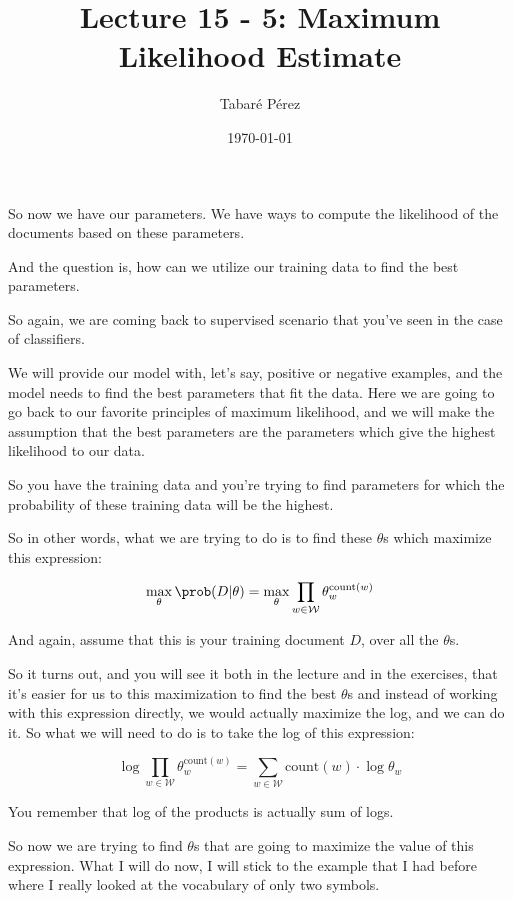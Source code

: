 \documentclass[a4paper, 12pt]{article}
\author{Tabaré Pérez}
\date{\today}
\title{Lecture 15 - 5: Maximum Likelihood Estimate}
\begin{document}
\maketitle
So now we have our parameters. We have ways to compute the likelihood of the
documents based on these parameters.

And the question is, how can we utilize our training data to find the best
parameters.

So again, we are coming back to supervised scenario that you've seen in the case
of classifiers.

We will provide our model with, let's say, positive or negative examples, and
the model needs to find the best parameters that fit the data. Here we are going
to go back to our favorite principles of maximum likelihood, and we will make
the assumption that the best parameters are the parameters which give the
highest likelihood to our data.

So you have the training data and you're trying to find parameters for which the
probability of these training data will be the highest.

So in other words, what we are trying to do is to find these \(\theta\)s which
maximize this expression:

\begin{equation}
\max_{\theta} \prob (D|\theta)=\max_{\theta}\prod_{w \in \mathcal{W}}\theta_{w}^{\text{count}(w)}
\end{equation}

And again, assume that this is your training document \(D\), over all the
\(\theta\)s.

So it turns out, and you will see it both in the lecture and in the exercises,
that it's easier for us to this maximization to find the best \(\theta\)s and
instead of working with this expression directly, we would actually maximize the
log, and we can do it. So what we will need to do is to take the log of this
expression:

\begin{equation}
\log\prod_{w \in \mathcal{W}} \theta_{w}^{\text{count}(w)}=\sum_{w \in \mathcal{W}} \text{count}(w) \cdot \log\theta_{w}
\end{equation}

You remember that log of the products is actually sum of logs.

So now we are trying to find \(\theta\)s that are going to maximize the value of
this expression. What I will do now, I will stick to the example that I had
before where I really looked at the vocabulary of only two symbols.
\end{document}
